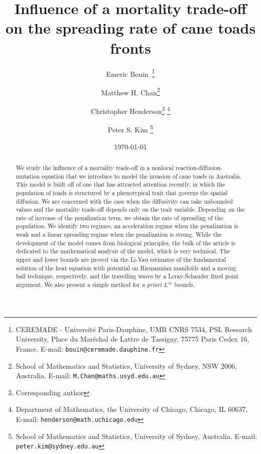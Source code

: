 \documentclass[11pt]{article}    %
\title{Influence of a mortality trade-off on the spreading rate of cane toads fronts}
\date\today                                           %
\author{Emeric Bouin\,
\footnote{CEREMADE - Universit\'e Paris-Dauphine, UMR CNRS 7534, PSL Research University, Place du Mar\'echal de Lattre de Tassigny, 75775 Paris Cedex 16, France. E-mail: \texttt{bouin@ceremade.dauphine.fr}}\; 
\and
Matthew H. Chan\footnote{School of Mathematics and Statistics, 
University of Sydney, NSW 2006, Australia. E-mail:
\texttt{M.Chan@maths.usyd.edu.au}}\;
\and
Christopher Henderson\footnote{Corresponding author} \footnote{Department of Mathematics, the University of Chicago, Chicago, IL 60637, E-mail: \texttt{henderson@math.uchicago.edu}}\;
\and
Peter S. Kim \footnote{School of Mathematics and Statistics, University of Sydney, Australia. E-mail:
\texttt{peter.kim@sydney.edu.au}}\;
}
\begin{document}
\maketitle

\begin{abstract}
\noindent We study the influence of a mortality trade-off in a nonlocal reaction-diffusion-mutation equation that we introduce to model the invasion of cane toads in Australia. This model is built off of one that has attracted attention recently, in which the population of toads is structured by a phenotypical trait that governs the spatial diffusion. We are concerned with the case when the diffusivity can take unbounded values and the mortality trade-off depends only on the trait variable. Depending on the rate of increase of the penalization term, we obtain the rate of spreading of the population. We identify two regimes, an acceleration regime when the penalization is weak and a linear spreading regime when the penalization is strong. While the development of the model comes from biological principles, the bulk of the article is dedicated to the mathematical analysis of the model, which is very technical.  The upper and lower bounds are proved via the Li-Yau estimates of the fundamental solution of the heat equation with potential on Riemannian manifolds and a moving ball technique, respectively, and the travelling waves by a Leray-Schauder fixed point argument.  We also present a simple method for {\em a priori} $L^\infty$ bounds.
\end{abstract}
\end{document}
